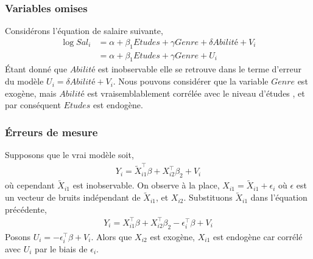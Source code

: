 \subsubsection*{Variables omises}
Considérons l'équation de salaire suivante,
\begin{align*}
\log Sal_i &= \alpha + \beta_1Etudes + \gamma Genre + \delta Abilité + V_i\\
&=\alpha + \beta_1Etudes + \gamma Genre + U_i
\end{align*}
\'Etant donné que $Abilité$ est inobservable elle se retrouve dans le terme d'erreur du modèle $U_i = \delta Abilité + V_i$. Nous pouvons considérer que la variable $Genre$ est exogène, mais $Abilité$ est vraisemblablement corrélée avec le niveau d'études , et par conséquent $Etudes$ est endogène.
\subsubsection*{\'Erreurs de mesure}
Supposons que le vrai modèle soit,
\begin{align*}
Y_i = \tilde{X}_{i1}^\top\beta + X_{i2}^\top\beta_2 + V_i
\end{align*}
où cependant $\tilde{X}_{i1}$ est inobservable. On observe à la place, $X_{i1} =  \tilde{X}_{i1}+\epsilon_i$ où $\epsilon$ est un vecteur de bruits indépendant de $\tilde{X}_{i1}$, et $X_{i2}$. Substituons $\tilde{X}_{i1}$ dans l'équation précédente,
\begin{align*}
Y_i = X_{i1} ^\top\beta + X_{i2}^\top\beta_2 - \epsilon_i^\top\beta + V_i
\end{align*}
Posons $U_i = - \epsilon_i^\top\beta + V_i$. Alors que $ X_{i2}$ est exogène, $X_{i1}$ est endogène car  corrélé avec $U_i$ par le biais de $\epsilon_i$.
